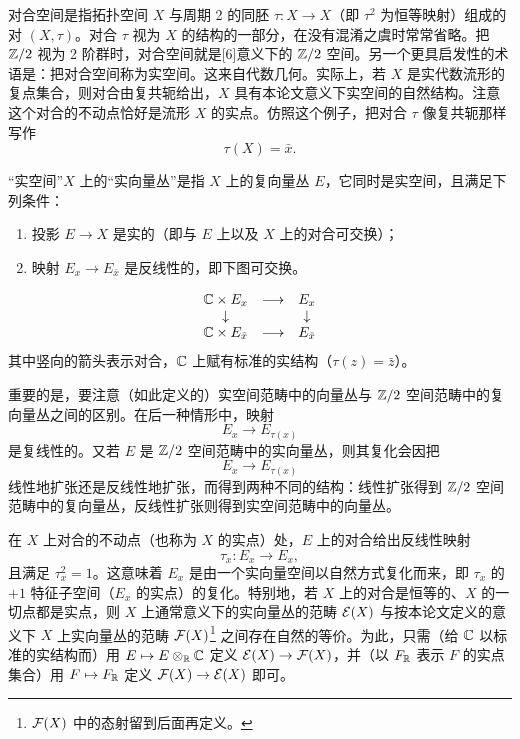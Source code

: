 对合空间是指拓扑空间 $X$ 与周期 2 的同胚 $\tau\colon X\to X$（即 $\tau^2$ 为恒等映射）组成的对 $(X,\tau)$。对合 $\tau$ 视为 $X$ 的结构的一部分，在没有混淆之虞时常常省略。把 $\mathbb{Z}/2$ 视为 2 阶群时，对合空间就是[6]意义下的 $\mathbb{Z}/2$ 空间。另一个更具启发性的术语是：把对合空间称为实空间。这来自代数几何。实际上，若 $X$ 是实代数流形的复点集合，则对合由复共轭给出，$X$ 具有本论文意义下实空间的自然结构。注意这个对合的不动点恰好是流形 $X$ 的实点。仿照这个例子，把对合 $\tau$ 像复共轭那样写作
\[
\tau(X)=\bar x.
\]

“实空间”$X$ 上的“实向量丛”是指 $X$ 上的复向量丛 $E$，它同时是实空间，且满足下列条件：

\begin{enumerate}[label=(\roman*),leftmargin=2.4em,itemsep=2pt]
\item 投影 $E\to X$ 是实的（即与 $E$ 上以及 $X$ 上的对合可交换）；
\item 映射 $E_x\to E_{\bar x}$ 是反线性的，即下图可交换。
\end{enumerate}

\[
\begin{array}{ccc}
\mathbb{C}\times E_x & \longrightarrow & E_x\\
\downarrow & & \downarrow\\
\mathbb{C}\times E_{\bar x} & \longrightarrow & E_{\bar x}
\end{array}
\]
其中竖向的箭头表示对合，$\mathbb{C}$ 上赋有标准的实结构（$\tau(z)=\bar z$）。

重要的是，要注意（如此定义的）实空间范畴中的向量丛与 $\mathbb{Z}/2$ 空间范畴中的复向量丛之间的区别。在后一种情形中，映射
\[
E_x\to E_{\tau(x)}
\]
是复线性的。又若 $E$ 是 $\mathbb{Z}/2$ 空间范畴中的实向量丛，则其复化会因把
\[
E_x\to E_{\tau(x)}
\]
线性地扩张还是反线性地扩张，而得到两种不同的结构：线性扩张得到 $\mathbb{Z}/2$ 空间范畴中的复向量丛，反线性扩张则得到实空间范畴中的向量丛。


在 $X$ 上对合的不动点（也称为 $X$ 的实点）处，$E$ 上的对合给出反线性映射
\[
\tau_x\colon E_x\to E_x,
\]
且满足 $\tau_x^2=1$。这意味着 $E_x$ 是由一个实向量空间以自然方式复化而来，即 $\tau_x$ 的 $+1$ 特征子空间（$E_x$ 的实点）的复化。特别地，若 $X$ 上的对合是恒等的、$X$ 的一切点都是实点，则 $X$ 上通常意义下的实向量丛的范畴 $\mathcal{E}(X)$ 与按本论文定义的意义下 $X$ 上实向量丛的范畴 $\mathcal{F}(X)$\footnote{$\mathcal{F}(X)$ 中的态射留到后面再定义。} 之间存在自然的等价。为此，只需（给 $\mathbb{C}$ 以标准的实结构而）用 $E\mapsto E\otimes_{\mathbb{R}}\mathbb{C}$ 定义 $\mathcal{E}(X)\to\mathcal{F}(X)$，并（以 $F_{\mathbb{R}}$ 表示 $F$ 的实点集合）用 $F\mapsto F_{\mathbb{R}}$ 定义 $\mathcal{F}(X)\to\mathcal{E}(X)$ 即可。

